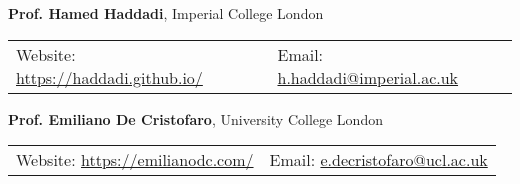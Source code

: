 \documentclass[8pt]{article}
\newcommand{\halfblankline}{\quad\vspace{-0.5\baselineskip}\pagebreak[3]}
\begin{document}
\halfblankline

\textbf{Prof. Hamed Haddadi}, Imperial College London

\enskip\begin{tabular}{p{6cm}l}
	Website: \href{https://haddadi.github.io/}{https://haddadi.github.io/} &
	Email: \href{mailto:h.haddadi@imperial.ac.uk}{h.haddadi@imperial.ac.uk}\\
\end{tabular}

\halfblankline

\textbf{Prof. Emiliano De Cristofaro}, University College London

\enskip\begin{tabular}{p{6cm}l}
	Website: \href{https://emilianodc.com/}{https://emilianodc.com/} &
	Email: \href{mailto:e.decristofaro@ucl.ac.uk}{e.decristofaro@ucl.ac.uk}\\
\end{tabular}
\end{document}
